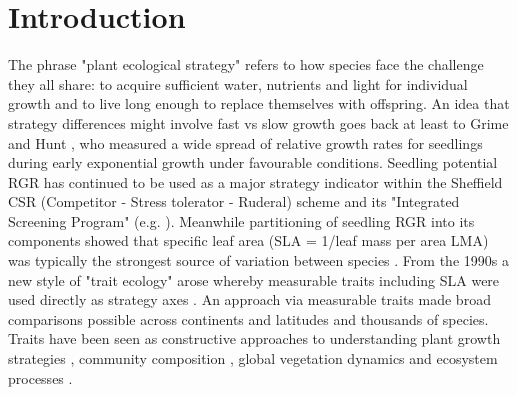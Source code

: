 \documentclass[a4paper]{article}\usepackage[]{graphicx}\usepackage[]{color}
\begin{document}
\section*{Introduction}\label{introduction}


The phrase "plant ecological strategy" refers to how species face the challenge they all share:  to acquire sufficient water, nutrients and light for individual growth and to live long enough to replace themselves with offspring. An idea that strategy differences might involve fast vs slow growth goes back at least to Grime and Hunt \citeyearpar{Grime:1975gr}, who measured a wide spread of relative growth rates for seedlings during early exponential growth under favourable conditions. Seedling potential RGR has continued to be used as a major strategy indicator within the Sheffield CSR (Competitor - Stress tolerator - Ruderal) scheme and its "Integrated Screening Program" (e.g. \citealt{grime1979plant, Grime:1997wm}). Meanwhile partitioning of seedling RGR into its components showed that specific leaf area (SLA = 1/leaf mass per area LMA) was typically the strongest source of variation between species \citep{Poorter:1989tx}. From the 1990s a new style of "trait ecology" arose whereby measurable traits including SLA were used directly as strategy axes \citep{Westoby:2002ft}. An approach via measurable traits made broad comparisons possible across continents and latitudes and thousands of species. Traits have been seen as constructive approaches to understanding plant growth strategies \citep{Grime:1977kc,Chapin:1980gz}, community composition \citep{Lavorel:2002ff,Shipley:2006ie}, global vegetation dynamics \citep{Scheiter:2013ed} and ecosystem processes \citep{Lavorel:2002ff}.
\end{document}
